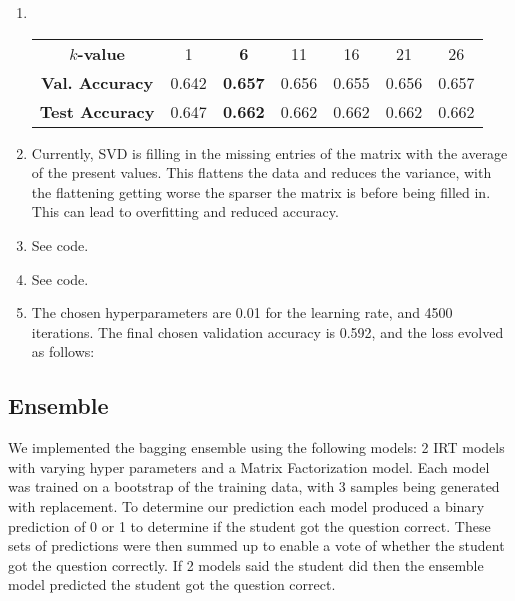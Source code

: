 \documentclass[twocolumn]{article}
\begin{document}
\begin{enumerate}

\item 
~
\vspace{-0.2cm}
\begin{mcfigure}
    \centering
    {\footnotesize
        \setlength{\tabcolsep}{3pt}
        \begin{tabular}{ |c|c|c|c|c|c|c| } 
            \hline
            \textbf{$k$-value} & 1 & {\bf6} &  11 & 16 & 21 & 26 \\ 
            \textbf{Val. Accuracy} & 0.642 & {\bf0.657} &  0.656
                              & 0.655 & 0.656 & 0.657 \\ 
            \textbf{Test Accuracy} & 0.647 & {\bf0.662} &  0.662
                              & 0.662 & 0.662 & 0.662 \\                  
            \hline
        \end{tabular}
    }
    \label{fig:userclustering}
\end{mcfigure}

\item 

Currently, SVD is filling in the missing entries of the matrix with the average of the present values. This flattens the data and reduces the variance, with the flattening getting worse the sparser the matrix is before being filled in. This can lead to overfitting and reduced accuracy.

\item 

See code.

\item 

See code.

\item 

The chosen hyperparameters are 0.01 for the learning rate, and 4500 iterations. The final chosen validation accuracy is 0.592, and the loss evolved as follows: 
\begin{figure}[H]
    \centering
    
    \label{fig:questionclustering}
\end{figure}

\end{enumerate}

\subsection{Ensemble}
\item
We implemented the bagging ensemble using the following models: 2 IRT models with varying hyper parameters and a Matrix Factorization model. Each model was trained on a bootstrap of the training data, with 3 samples being generated with replacement. To determine our prediction each model produced a binary prediction of 0 or 1 to determine if the student got the question correct.  These sets of predictions were then summed up to enable a vote of whether the student got the question correctly. If 2 models said the student did then the ensemble model predicted the student got the question correct. 
\end{document}
